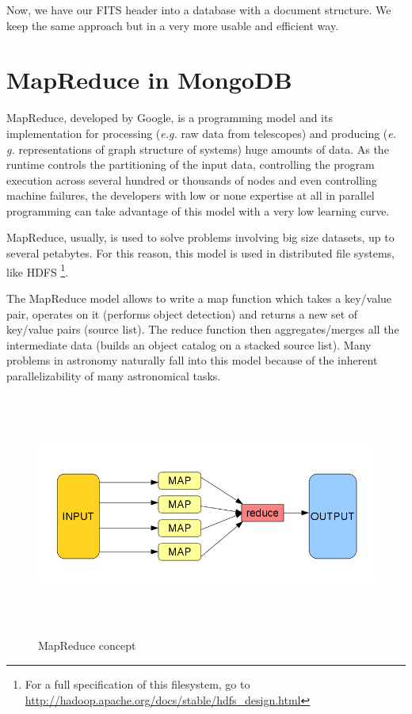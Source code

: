 Now, we have our FITS header into a database with a document structure. We keep the same approach but in a very more usable and efficient way.



\section{MapReduce in MongoDB}

MapReduce, developed by Google, is a programming model and its implementation for processing (\textit{e.g.} raw data from telescopes) and producing (\textit{e. g.} representations of graph structure of systems) huge amounts of data. As the runtime controls the partitioning of the input data, controlling the program execution across several hundred or thousands of nodes and even controlling machine failures, the developers with low or none expertise at all in parallel programming can take advantage of this model with a very low learning curve.

MapReduce, usually, is used to solve problems involving big size datasets, up to several petabytes. For this reason, this model is used in distributed file systems, like HDFS \footnote{For a full specification of this filesystem, go to \url{http://hadoop.apache.org/docs/stable/hdfs_design.html}}.

The MapReduce model allows to write a map function which takes a key/value pair, operates on it (performs object detection) and returns a new set of key/value pairs (source list). The reduce function then aggregates/merges all the intermediate data (builds an object catalog on a stacked source list). Many problems in astronomy naturally fall into this model because of the inherent parallelizability of many astronomical tasks.

\begin{figure}[H]
\centering
\includegraphics[width=16cm,height=8cm]{images/map_reduce_chart.png}
\caption{MapReduce concept}
\end{figure}

